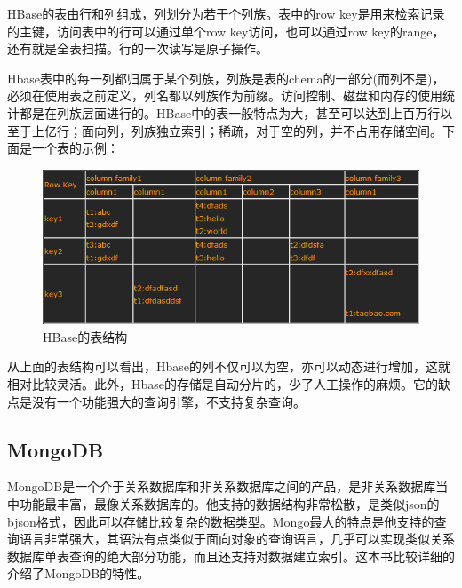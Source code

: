   HBase的表由行和列组成，列划分为若干个列族。表中的row key是用来检索记录的主键，访问表中的行可以通过单个row key访问，也可以通过row key的range，还有就是全表扫描。行的一次读写是原子操作。


  Hbase表中的每一列都归属于某个列族，列族是表的chema的一部分(而列不是)，必须在使用表之前定义，列名都以列族作为前缀。访问控制、磁盘和内存的使用统计都是在列族层面进行的。HBase中的表一般特点为大，甚至可以达到上百万行以至于上亿行；面向列，列族独立索引；稀疏，对于空的列，并不占用存储空间。下面是一个表的示例：

\begin{figure}[!ht]
\centering
\includegraphics[]{photo/hbaseTable.PNG} 
\caption{HBase的表结构}
\end{figure} 

  从上面的表结构可以看出，Hbase的列不仅可以为空，亦可以动态进行增加，这就相对比较灵活。此外，Hbase的存储是自动分片的，少了人工操作的麻烦。它的缺点是没有一个功能强大的查询引擎，不支持复杂查询。

\subsection{MongoDB}
MongoDB是一个介于关系数据库和非关系数据库之间的产品，是非关系数据库当中功能最丰富，最像关系数据库的。他支持的数据结构非常松散，是类似json的bjson格式，因此可以存储比较复杂的数据类型。Mongo最大的特点是他支持的查询语言非常强大，其语法有点类似于面向对象的查询语言，几乎可以实现类似关系数据库单表查询的绝大部分功能，而且还支持对数据建立索引。\cite{MongoDBGuide}这本书比较详细的介绍了MongoDB的特性。

